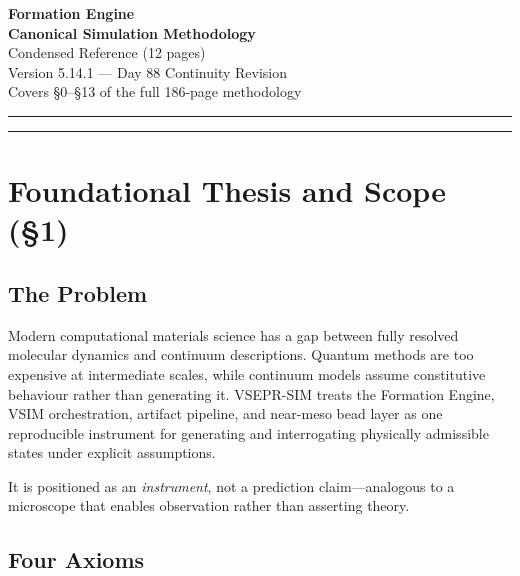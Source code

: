 \documentclass[11pt, a4paper]{article}
\begin{document}
\begin{center}
{\LARGE\bfseries Formation Engine}\\[0.3em]
{\LARGE\bfseries Canonical Simulation Methodology}\\[0.8em]
{\large Condensed Reference (12 pages)}\\[0.5em]
{\normalsize Version 5.14.1 --- Day 88 Continuity Revision}\\[0.3em]
{\small Covers \S0--\S13 of the full 186-page methodology}
\end{center}

\vspace{0.5em}\hrule\vspace{1em}

\tableofcontents
\vspace{1em}\hrule\vspace{1em}

\section{Foundational Thesis and Scope (\S1)}

\subsection{The Problem}

Modern computational materials science has a gap between fully resolved molecular dynamics and continuum descriptions. Quantum methods are too expensive at intermediate scales, while continuum models assume constitutive behaviour rather than generating it. VSEPR-SIM treats the Formation Engine, VSIM orchestration, artifact pipeline, and near-meso bead layer as one reproducible instrument for generating and interrogating physically admissible states under explicit assumptions.

It is positioned as an \emph{instrument}, not a prediction claim---analogous to a microscope that enables observation rather than asserting theory.

\subsection{Four Axioms}
\end{document}
